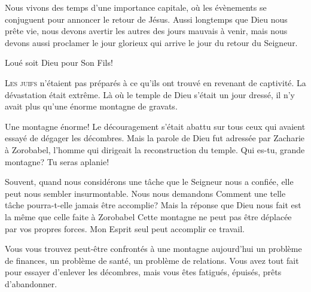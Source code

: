 Nous vivons des temps d'une importance capitale, où les évènements
 se conjuguent pour annoncer le retour de Jésus. Aussi longtemps que Dieu
 nous prête vie, nous devons avertir les autres des jours mauvais à venir,
 mais nous devons aussi proclamer le jour glorieux qui arrive
 \ocadr le jour du retour du Seigneur. 

Loué soit Dieu pour Son Fils! 

\dvrule






\lettrine{L}{es juifs} n'étaient pas préparés à ce qu'ils ont trouvé
 en revenant de captivité. La dévastation était extrême.
 Là où le temple de Dieu s'était un jour dressé,
 il n'y avait plus qu'une énorme montagne de gravats. 

Une montagne énorme! Le découragement s'était abattu sur tous ceux
 qui avaient essayé de dégager les décombres. Mais la parole de Dieu
 fut adressée par Zacharie à Zorobabel, l'homme qui dirigeait
 la reconstruction du temple.
 \Og Qui es-tu, grande montagne? Tu seras aplanie! \Fg{}

Souvent, quand nous considérons une tâche que le Seigneur nous a confiée,
 elle peut nous sembler insurmontable. Nous nous demandons\frcolon{} 
 \Og Comment une telle tâche pourra-t-elle jamais être accomplie? \Fg{}
 Mais la réponse que Dieu nous fait est la même que celle faite à Zorobabel\frcolon{}
 \Og Cette montagne ne peut pas être déplacée par vos propres forces.
 Mon Esprit seul peut accomplir ce travail. \Fg{}

Vous vous trouvez peut-être confrontés à une montagne aujourd'hui
 \ocadr un problème de finances, un problème de santé,
 un problème de relations. Vous avez tout fait pour essayer
 d'enlever les décombres, mais vous êtes fatigués, épuisés, prêts d'abandonner. 

